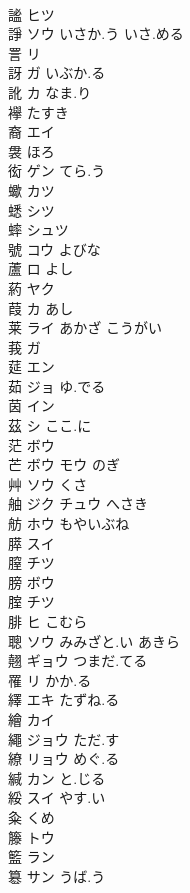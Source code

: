 \documentclass[8pt]{extreport}
\begin{document}
\begin{CJK}{UTF8}{min}
\\	謐	ヒツ			
\\	諍	ソウ いさか.う いさ.める			
\\	詈	リ			
\\	訝	ガ いぶか.る			
\\	訛	カ なま.り			
\\	襷	たすき			
\\	裔	エイ			
\\	袰	ほろ			
\\	衒	ゲン てら.う			
\\	蠍	カツ			
\\	蟋	シツ			
\\	蟀	シュツ			
\\	號	コウ よびな					
\\	蘆	ロ よし			
\\	葯	ヤク			
\\	葭	カ あし			
\\	莱	ライ あかざ こうがい			
\\	莪	ガ			
\\	莚	エン			
\\	茹	ジョ ゆ.でる			
\\	茵	イン			
\\	茲	シ ここ.に			
\\	茫	ボウ			
\\	芒	ボウ モウ のぎ			
\\	艸	ソウ くさ			
\\	舳	ジク チュウ へさき			
\\	舫	ホウ もやいぶね			
\\	膵	スイ			
\\	膣	チツ			
\\	膀	ボウ			
\\	腟	チツ			
\\	腓	ヒ こむら			
\\	聰	ソウ みみざと.い あきら			
\\	翹	ギョウ つまだ.てる			
\\	罹	リ かか.る			
\\	繹	エキ たずね.る			
\\	繪	カイ			
\\	繩	ジョウ ただ.す			
\\	繚	リョウ めぐ.る			
\\	緘	カン と.じる			
\\	綏	スイ やす.い			
\\	粂	くめ			
\\	籐	トウ			
\\	籃	ラン			
\\	簒	サン うば.う			

\end{CJK}
\end{document}
